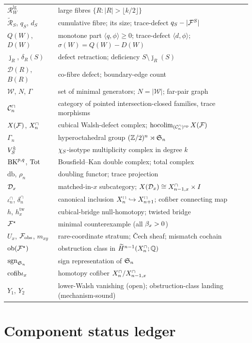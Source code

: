 \begin{longtable}{p{}p{}}
$\mathcal R_W^{\mathrm{lg}}$ & large fibres $\{R:|R|>\lfloor k/2\rfloor\}$ \\
$\widetilde{\mathcal R}_S$, $q_S$, $d_S$ & cumulative fibre; its size; trace-defect $q_S-|\mathcal{F}^S|$ \\
$Q(W)$, $D(W)$ & monotone part $\langle q,\phi\rangle\ge0$; trace-defect $\langle d,\phi\rangle$; $\sigma(W)=Q(W)-D(W)$ \\
$\bar\jmath_R$, $\delta_R(S)$ & defect retraction; deficiency $S\setminus\bar\jmath_R(S)$ \\
$\mathcal D(R)$, $B(R)$ & co-fibre defect; boundary-edge count \\
$\mathcal W$, $N$, $\Gamma$ & set of minimal generators; $N=|\mathcal W|$; far-pair graph \\
$\mathcal{C}^{\cap}_n$ & category of pointed intersection-closed families, trace morphisms \\
$X(\mathcal{F})$, $X^{\cap}_n$ & cubical Walsh-defect complex; $\operatorname*{hocolim}_{(\mathcal{C}^{\cap}_n)^{\mathrm{op}}}X(\mathcal{F})$ \\
$\Gamma_n$ & hyperoctahedral group $(\mathbb{Z}/2)^n\rtimes\mathfrak{S}_n$ \\
$V_{S}^{k}$ & $\chi_{S}$-isotype multiplicity complex in degree $k$ \\
$\mathrm{BK}^{p,q}$, $\mathrm{Tot}$ & Bousfield--Kan double complex; total complex \\
$\mathrm{db}$, $\rho_n$ & doubling functor; trace projection \\
$\mathcal{D}_x$ & matched-in-$x$ subcategory; $X(\mathcal{D}_x)\cong X^{\cap}_{n-1,x}\times I$ \\
$\iota^{\cap}_n$, $\delta^{\cap}_n$ & canonical inclusion $X^{\cap}_n\hookrightarrow X^{\cap}_{n+1}$; cofiber connecting map \\
$h$, $h_x^{\mathrm{tw}}$ & cubical-bridge null-homotopy; twisted bridge \\
$\mathcal{F}^{\star}$ & minimal counterexample (all $\beta_x>0$) \\
$U_x$, $\mathcal{F}_{\mathrm{obs}}$, $m_{xy}$ & rare-coordinate stratum; \v{C}ech sheaf; mismatch cochain \\
$\mathrm{ob}(\mathcal{F}^{\star})$ & obstruction class in $\widetilde H^{n-1}(X^{\cap}_n;\mathbb{Q})$ \\
$\mathrm{sgn}_{\mathfrak{S}_n}$ & sign representation of $\mathfrak{S}_n$ \\
$\mathrm{cofib}\iota_x$ & homotopy cofiber $X^{\cap}_n/X^{\cap}_{n-1,x}$ \\
$Y_1$, $Y_2$ & lower-Walsh vanishing (open); obstruction-class landing (mechanism-sound) \\
\end{longtable}

\section{Component status ledger}
\label{sec:appendix-status}

